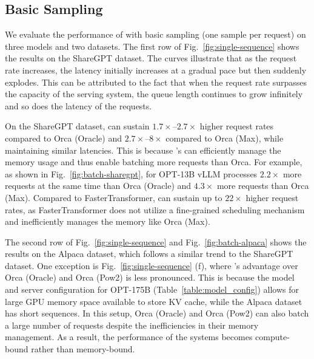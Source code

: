 \subsection{Basic Sampling}
\label{sec:eval:basic-sampling}

We evaluate the performance of \sys with basic sampling (one sample per request) on three models and two datasets.
The first row of Fig.~\ref{fig:single-sequence} shows the results on the ShareGPT dataset.
The curves illustrate that as the request rate increases, the latency initially increases at a gradual pace but then suddenly explodes.
This can be attributed to the fact that when the request rate surpasses the capacity of the serving system, the queue length continues to grow infinitely and so does the latency of the requests.

On the ShareGPT dataset, \sys can sustain $1.7\times$--$2.7\times$ higher request rates compared to Orca (Oracle) and $2.7\times$--$8\times$ compared to Orca (Max), while maintaining similar latencies.
This is because \sys's \tech can efficiently manage the memory usage and thus enable batching more requests than Orca.
For example, as shown in Fig.~\ref{fig:batch-sharegpt}, for OPT-13B vLLM processes $2.2\times$ more requests at the same time than Orca (Oracle) and $4.3\times$ more requests than Orca (Max).
Compared to FasterTransformer, \sys can sustain up to $22\times$ higher request rates, as FasterTransformer does not utilize a fine-grained scheduling mechanism and inefficiently manages the memory like Orca (Max).

The second row of Fig.~\ref{fig:single-sequence} and Fig.~\ref{fig:batch-alpaca} shows the results on the Alpaca dataset, which follows a similar trend to the ShareGPT dataset.
One exception is Fig.~\ref{fig:single-sequence} (f), where \sys's advantage over Orca (Oracle) and Orca (Pow2) is less pronounced.
This is because the model and server configuration for OPT-175B (Table~\ref{table:model_config}) allows for large GPU memory space available to store KV cache, while the Alpaca dataset has short sequences.
In this setup, Orca (Oracle) and Orca (Pow2) can also batch a large number of requests despite the inefficiencies in their memory management.
As a result, the performance of the systems becomes compute-bound rather than memory-bound.


